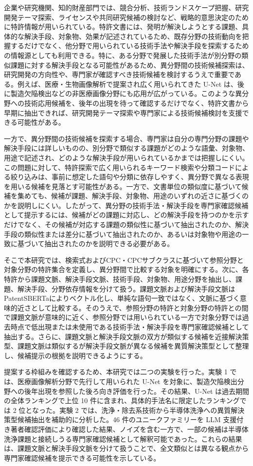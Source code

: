 企業や研究機関、知的財産部門では、競合分析、技術ランドスケープ把握、研究開発テーマ探索、ライセンスや共同研究候補の検討など、戦略的意思決定のために特許情報が用いられている。特許文書には、発明が解決しようとする課題、具体的な解決手段、対象物、効果が記述されているため、既存分野の技術動向を把握するだけでなく、他分野で用いられている技術手法や解決手段を探索するための情報源としても利用できる。特に、ある分野で発展した技術手法が別分野の類似課題に対する解決手段となる可能性があるため、異分野間の技術候補探索は、研究開発の方向性や、専門家が確認すべき技術候補を検討するうえで重要である。例えば、医療・生物画像解析で提案され広く用いられてきた U-Net は、後に製造欠陥検出などの非医療画像分野にも応用が広がっている。このような異分野への技術応用候補を、後年の出現を待って確認するだけでなく、特許文書から早期に抽出できれば、研究開発テーマ探索や専門家による技術候補検討を支援できる可能性がある。

一方で、異分野間の技術候補を探索する場合、専門家は自分の専門分野の課題や解決手段には詳しいものの、別分野で類似する課題がどのような語彙、対象物、用途で記述され、どのような解決手段が用いられているかまでは把握しにくい。この問題に対して、特許探索で広く用いられるキーワード検索や分類コードによる絞り込みは、事前に想定した語句や分類に依存しやすく、異分野で異なる表現を用いる候補を見落とす可能性がある。一方で、文書単位の類似度に基づいて候補を集めても、候補が課題、解決手段、対象物、用途のいずれの近さに基づくのかを説明しにくい。したがって、異分野の技術手法・解決手段を専門家確認候補として提示するには、候補がどの課題に対応し、どの解決手段を持つのかを示すだけでなく、その候補が対応する課題の類似性に基づいて抽出されたのか、解決手段の類似性または差分に基づいて抽出されたのか、あるいは対象物や用途の一致に基づいて抽出されたのかを説明できる必要がある。

そこで本研究では、検索式およびCPC・CPCサブクラスに基づいて参照分野と対象分野の特許集合を定義し、異分野間で比較する対象を明確にする。次に、各特許から課題文脈、解決手段文脈、技術手段、対象物、用途分野を抽出し、課題、解決手段、分野依存情報を分けて扱う。課題文脈および解決手段文脈はPatentSBERTaによりベクトル化し、単純な語句一致ではなく、文脈に基づく意味的近さとして比較する。そのうえで、参照分野の特許と対象分野の特許との間で課題文脈が意味的に近く、参照分野では用いられている一方で対象分野では過去時点で低出現または未使用である技術手法・解決手段を専門家確認候補として抽出する。さらに、課題文脈と解決手段文脈の双方が類似する候補を近接解決策型、課題文脈は類似するが解決手段文脈が異なる候補を異質解決策型として整理し、候補提示の根拠を説明できるようにする。

提案する枠組みを確認するため、本研究では二つの実験を行った。実験 1 では、医療画像解析分野で先行して用いられた U-Net を対象に、製造欠陥検出分野への後年出現を参照した後ろ向き評価を行った。その結果、U-Net は過去期間の全体ランキングで上位 10 件に含まれ、具体的手法名に限定したランキングでは 2 位となった。実験 2 では、洗浄・除去系技術から半導体洗浄への異質解決策型候補抽出を補助的に分析した。46 件のユニークファミリーを LLM 支援付き著者確認評価により確認した結果、ノイズを含む一方で、一部の候補は半導体洗浄課題と接続しうる専門家確認候補として解釈可能であった。これらの結果は、課題文脈と解決手段文脈を分けて扱うことで、全文類似とは異なる観点から専門家確認候補を提示できる可能性を示している。

